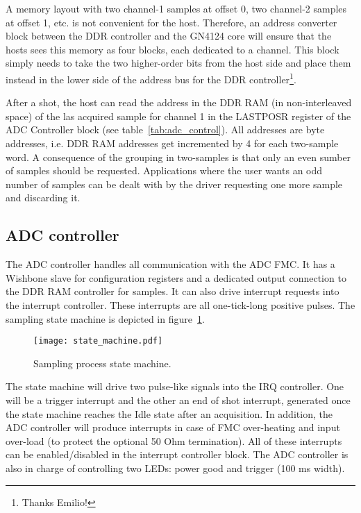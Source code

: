 \documentclass{article}
\begin{document}
A memory layout with two channel-1 samples at offset 0, two channel-2 samples at offset 1, etc. is not convenient for the host. Therefore, an address converter block between the DDR controller and the GN4124 core will ensure that the hosts sees this memory as four blocks, each dedicated to a channel. This block simply needs to take the two higher-order bits from the host side and place them instead in the lower side of the address bus for the DDR controller\footnote{Thanks Emilio!}.
 
After a shot, the host can read the address in the DDR RAM (in non-interleaved space) of the las acquired sample for channel 1 in the LASTPOSR register of the ADC Controller block (see table~\ref{tab:adc_control}). All addresses are byte addresses, i.e. DDR RAM addresses get incremented by 4 for each two-sample word. A consequence of the grouping in two-samples is that only an even sumber of samples should be requested. Applications where the user wants an odd number of samples can be dealt with by the driver requesting one more sample and discarding it. 

\subsection{ADC controller}
The ADC controller handles all communication with the ADC FMC. It has a Wishbone slave for configuration registers and a dedicated output connection to the DDR RAM controller for samples. It can also drive interrupt requests into the interrupt controller. These interrupts are all one-tick-long positive pulses. The sampling state machine is depicted in figure~\ref{fig:state_machine}. 

\begin{figure}[htbp]
  \centering
  \texttt{[image: state\_machine.pdf]}
  \caption{Sampling process state machine.}
  \label{fig:state_machine}
\end{figure}

The state machine will drive two pulse-like signals into the IRQ controller. One will be a trigger interrupt and the other an end of shot interrupt, generated once the state machine reaches the Idle state after an acquisition. In addition, the ADC controller will produce interrupts in case of FMC over-heating and input over-load (to protect the optional 50 Ohm termination). All of these interrupts can be enabled/disabled in the interrupt controller block. The ADC controller is also in charge of controlling two LEDs: power good and trigger (100 ms width).
\end{document}
